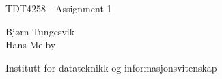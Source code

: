 \begin{titlepage}
    \begin{center}
      \large  
      
      \hfill
      
      \vfill
      
      \begingroup
      \LARGE TDT4258 - Assignment 1
      \bigskip
      \endgroup
      
      {\sc Bjørn Tungesvik}\\
      {\sc Hans Melby} \\
      
      \vspace{12cm}

      Institutt for datateknikk og informasjonsvitenskap 
       
    \end{center}  
\end{titlepage}
